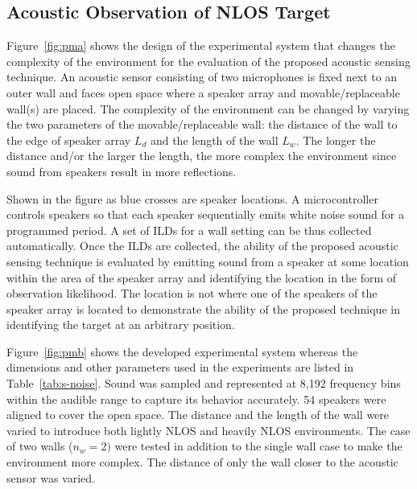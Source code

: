 \subsection{Acoustic Observation of NLOS Target}
Figure~\ref{fig:pma} shows the design of the experimental system that changes the complexity of the environment for the evaluation of the proposed acoustic sensing technique.  An acoustic sensor consisting of two microphones is fixed next to an outer wall and faces open space where a speaker array and movable/replaceable wall(s) are placed.  The complexity of the environment can be changed by varying the two parameters of the movable/replaceable wall: the distance of the wall to the edge of speaker array $L_d$ and the length of the wall $L_w$.  The longer the distance and/or the larger the length, the more complex the environment since sound from speakers result in more reflections.  

Shown in the figure as blue crosses are speaker locations.  A microcontroller controls speakers so that each speaker sequentially emits white noise sound for a programmed period.  A set of ILDs for a wall setting can be thus collected automatically.  Once the ILDs are collected, the ability of the proposed acoustic sensing technique is evaluated by emitting sound from a speaker at some location within the area of the speaker array and identifying the location in the form of observation likelihood.  The location is not where one of the speakers of the speaker array is located to demonstrate the ability of the proposed technique in identifying the target at an arbitrary position.  

Figure~\ref{fig:pmb} shows the developed experimental system \linebreak[4]whereas the dimensions and other parameters used in the experiments are listed in Table~\ref{tab:s-noise}.  Sound was sampled and represented at 8,192 frequency bins within the audible range to capture its behavior accurately.  54 speakers were aligned to cover the open space.  The distance and the length of the wall were varied to introduce both lightly NLOS and heavily NLOS environments.  The case of two walls ($n_w=2)$ were tested in addition to the single wall case to make the environment more complex.  The distance of only the wall closer to the acoustic sensor was varied.  


